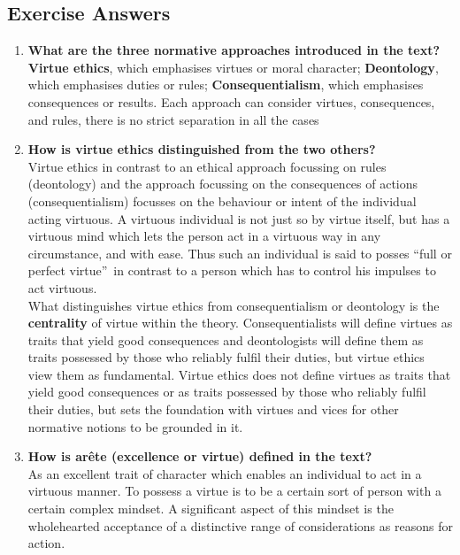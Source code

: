 \documentclass[11pt]{article}
\theoremstyle{definition}
\begin{document}
\subsection{Exercise Answers}
\begin{enumerate}
	\item \textbf{What are the three normative approaches introduced in the text?}\\
	\textbf{Virtue ethics}, which emphasises virtues or moral character; \textbf{Deontology}, which emphasises duties or rules; \textbf{Consequentialism}, which emphasises consequences or results. Each approach can consider virtues, consequences, and rules, there is no strict separation in all the cases
	\item \textbf{How is virtue ethics distinguished from the two others?}\\
	Virtue ethics in contrast to an ethical approach focussing on rules (deontology) and the approach focussing on the consequences of actions (consequentialism) focusses on the behaviour or intent of the individual acting virtuous. A virtuous individual is not just so by virtue itself, but has a virtuous mind which lets the person act in a virtuous way in any circumstance, and with ease. Thus such an individual is said to posses \textquotedblleft full or perfect virtue\textquotedblright\ in contrast to a person which has to control his impulses to act virtuous.\\
	What distinguishes virtue ethics from consequentialism or deontology is the \textbf{centrality} of virtue within the theory. Consequentialists will define virtues as traits that yield good consequences and deontologists will define them as traits possessed by those who reliably fulfil their duties, but virtue ethics view them as fundamental. Virtue ethics does not define virtues as traits that yield good consequences or as traits possessed by those who reliably fulfil their duties, but sets the foundation with virtues and vices for other normative notions to be grounded in it.
	\item \textbf{How is arête (excellence or virtue) defined in the text?}\\
	As an excellent trait of character which enables an individual to act in a virtuous manner. To possess a virtue is to be a certain sort of person with a certain complex mindset. A significant aspect of this mindset is the wholehearted acceptance of a distinctive range of considerations as reasons for action.
\end{enumerate}
\end{document}
